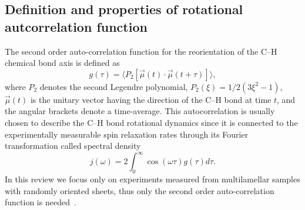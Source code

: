 \documentclass[aps,prl,superscriptaddress,twocolumn]{revtex4}
\begin{document}

\subsection{Definition and properties of rotational autcorrelation function}
The second order auto-correlation function for the reorientation of the C--H chemical bond axis is defined as \cite{Lipari82}
\begin{equation}\label{gt}
g(\tau) = \langle P_2[\vec{\mu}(t)\cdot\vec{\mu}(t+\tau)]\rangle,
\end{equation} 
where $P_2$ denotes the second Legendre polynomial, $P_2(\xi) = 1/2 (3\xi^2 - 1)$, $\vec{\mu}(t)$ is the unitary vector having the 
direction of the C--H bond at time $t$, and the angular brackets denote a time-average. This autocorrelation is usually chosen
to describe the C--H bond rotational dynamics since it is connected to the experimentally measurable spin relaxation rates 
through its Fourier transformation called spectral density
\begin{equation}\label{FT}
j(\omega) =  2\int_0^{\infty} \cos(\omega \tau) g(\tau) d\tau.
\end{equation}
In this review we focus only on experiments measured from multilamellar samples with randomly oriented sheets, 
thus only the second order auto-correlation function is needed~\cite{??}. 
\end{document}
